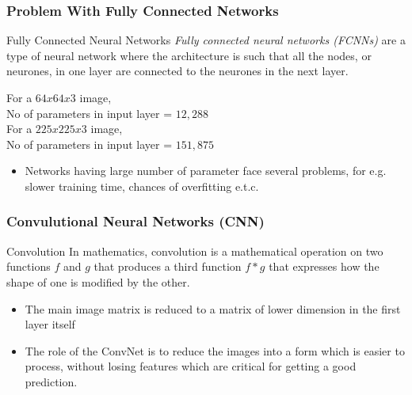\documentclass[aspectratio=169, 11pt]{beamer}
\begin{document}
\begin{frame}
	\frametitle{Problem With Fully Connected Networks}
	\begin{block}{Fully Connected Neural Networks}
	\emph{Fully connected neural networks (FCNNs)} are a type of neural network where the architecture is such that all the nodes, or neurones, in one layer are connected to the neurones in the next layer. 
	\end{block}
	For a $64 x 64 x 3$ image,\\
	No of parameters in input layer = $12,288$
	\\
	\vspace{4pt}
	For a $225x225x3$ image,\\
	No of parameters in input layer = $151,875$
	\begin{itemize}
		\item Networks having large number of parameter face several problems, for 				e.g. slower training time, chances of overfitting e.t.c.
	\end{itemize}

\end{frame}


\begin{frame}
	\frametitle{Convulutional Neural Networks (CNN)}

	\begin{block}{Convolution}
		In mathematics, \alert{convolution} is a mathematical operation on two 					functions $f$ and $g$ that produces a third function $f * g$ that expresses 			how the shape of one is modified by the other.
	\end{block}
 	
	\begin{itemize}
		\item The main image matrix is reduced to a matrix of lower dimension in the first layer itself
		\item  The role of the ConvNet is to reduce the images into a form which is easier to process, without losing features which are critical for getting a good prediction.
	\end{itemize}
		
\end{frame}
\end{document}
